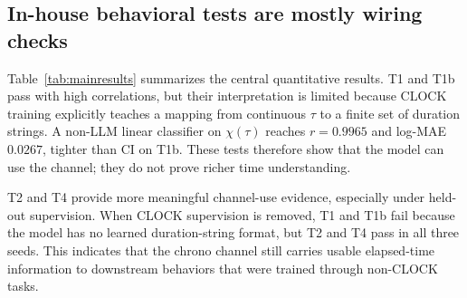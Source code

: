 \documentclass[conference,10pt]{IEEEtran}
\newcommand{\CI}{\textsc{CI}}
\newcommand{\Tau}{\tau}
\begin{document}
\subsection{In-house behavioral tests are mostly wiring checks}

Table~\ref{tab:mainresults} summarizes the central quantitative results. T1 and T1b pass with high correlations, but their interpretation is limited because CLOCK training explicitly teaches a mapping from continuous $\Tau$ to a finite set of duration strings. A non-LLM linear classifier on $\chi(\Tau)$ reaches $r=0.9965$ and log-MAE $0.0267$, tighter than \CI{} on T1b. These tests therefore show that the model can use the channel; they do not prove richer time understanding.

T2 and T4 provide more meaningful channel-use evidence, especially under held-out supervision. When CLOCK supervision is removed, T1 and T1b fail because the model has no learned duration-string format, but T2 and T4 pass in all three seeds. This indicates that the chrono channel still carries usable elapsed-time information to downstream behaviors that were trained through non-CLOCK tasks.
\end{document}
